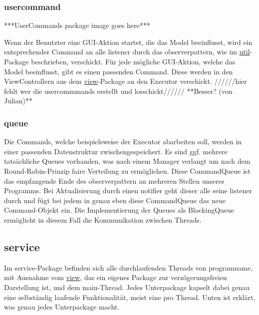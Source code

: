       \subsubsection{usercommand}
      \label{subsubsec:usercommand}
      ***UserCommands package image goes here***
      \newline
      \newline

      Wenn der Benutzter eine GUI-Aktion startet, die das Model beeinflusst,
      wird ein entsprechender Command an alle \gls{listener} durch das \gls{observerpattern}, wie im
      \hyperref[subsec:util]{util}-Package beschrieben, verschickt. Für jede mögliche
      GUI-Aktion, welche das Model beeinflusst, gibt es einen passenden Command.
      Diese werden in den ViewControllern aus dem \hyperref[subsec:view]{view}-Package
      an den Executor verschickt.
      //////hier fehlt wer die usercommmands erstellt und losschickt////// **Besser? (von Julian)**

      \subsubsection{queue}
      \label{subsubsec:queue}
      Die Commands, welche beispielsweise der Executor abarbeiten soll, werden in
      einer passenden Datenstruktur zwischengespeichert. Es sind ggf. mehrere
      tatsächliche Queues vorhanden, was nach einem Manager verlangt um nach dem
      Round-Robin-Prinzip faire Verteilung zu ermöglichen. Diese CommandQueue
      ist das empfangende Ende des \gls{observerpattern} an mehreren Stellen unseres
      Programms. Bei Aktualisierung durch einen \gls{notifier} geht dieser alle
      seine \gls{listener} durch und fügt bei jedem in genau eben diese
      CommandQueue das neue Command-Objekt ein. Die Implementierung der Queues
      als BlockingQueue ermöglicht in diesem Fall die Kommunikation zwischen Threads.

\subsection{service}
\label{subsec:service}

Im service-Package befinden sich alle durchlaufenden Threads von \gls{programname},
mit Ausnahme vom \hyperref[subsec:view]{view}, das ein eigenes Package zur verzögerungsfreien Darstellung ist, und dem
main-Thread. Jedes Unterpackage kapselt dabei genau eine selbständig laufende Funktionalität, meist eine pro Thread. Unten ist erklärt, was genau jedes Unterpackage macht.

